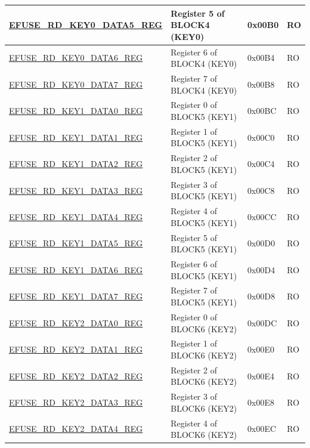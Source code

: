 \begin{longtable}{ | p{6.8cm} | p{7cm} | p{1.3cm} | p{1.2cm} | }
    \hyperref[regdesc:EFUSERDKEY0DATANREG]{EFUSE\_RD\_KEY0\_DATA5\_REG} & Register 5 of BLOCK4 (KEY0) & 0x00B0 & RO \\ \hline
    \hyperref[regdesc:EFUSERDKEY0DATANREG]{EFUSE\_RD\_KEY0\_DATA6\_REG} & Register 6 of BLOCK4 (KEY0) & 0x00B4 & RO \\ \hline
    \hyperref[regdesc:EFUSERDKEY0DATANREG]{EFUSE\_RD\_KEY0\_DATA7\_REG} & Register 7 of BLOCK4 (KEY0) & 0x00B8 & RO \\ \hline
    \hyperref[regdesc:EFUSERDKEY1DATANREG]{EFUSE\_RD\_KEY1\_DATA0\_REG} & Register 0 of BLOCK5 (KEY1) & 0x00BC & RO \\ \hline
    \hyperref[regdesc:EFUSERDKEY1DATANREG]{EFUSE\_RD\_KEY1\_DATA1\_REG} & Register 1 of BLOCK5 (KEY1) & 0x00C0 & RO \\ \hline
    \hyperref[regdesc:EFUSERDKEY1DATANREG]{EFUSE\_RD\_KEY1\_DATA2\_REG} & Register 2 of BLOCK5 (KEY1) & 0x00C4 & RO \\ \hline
    \hyperref[regdesc:EFUSERDKEY1DATANREG]{EFUSE\_RD\_KEY1\_DATA3\_REG} & Register 3 of BLOCK5 (KEY1) & 0x00C8 & RO \\ \hline
    \hyperref[regdesc:EFUSERDKEY1DATANREG]{EFUSE\_RD\_KEY1\_DATA4\_REG} & Register 4 of BLOCK5 (KEY1) & 0x00CC & RO \\ \hline
    \hyperref[regdesc:EFUSERDKEY1DATANREG]{EFUSE\_RD\_KEY1\_DATA5\_REG} & Register 5 of BLOCK5 (KEY1) & 0x00D0 & RO \\ \hline
    \hyperref[regdesc:EFUSERDKEY1DATANREG]{EFUSE\_RD\_KEY1\_DATA6\_REG} & Register 6 of BLOCK5 (KEY1) & 0x00D4 & RO \\ \hline
    \hyperref[regdesc:EFUSERDKEY1DATANREG]{EFUSE\_RD\_KEY1\_DATA7\_REG} & Register 7 of BLOCK5 (KEY1) & 0x00D8 & RO \\ \hline
    \hyperref[regdesc:EFUSERDKEY2DATANREG]{EFUSE\_RD\_KEY2\_DATA0\_REG} & Register 0 of BLOCK6 (KEY2) & 0x00DC & RO \\ \hline
    \hyperref[regdesc:EFUSERDKEY2DATANREG]{EFUSE\_RD\_KEY2\_DATA1\_REG} & Register 1 of BLOCK6 (KEY2) & 0x00E0 & RO \\ \hline
    \hyperref[regdesc:EFUSERDKEY2DATANREG]{EFUSE\_RD\_KEY2\_DATA2\_REG} & Register 2 of BLOCK6 (KEY2) & 0x00E4 & RO \\ \hline
    \hyperref[regdesc:EFUSERDKEY2DATANREG]{EFUSE\_RD\_KEY2\_DATA3\_REG} & Register 3 of BLOCK6 (KEY2) & 0x00E8 & RO \\ \hline
    \hyperref[regdesc:EFUSERDKEY2DATANREG]{EFUSE\_RD\_KEY2\_DATA4\_REG} & Register 4 of BLOCK6 (KEY2) & 0x00EC & RO \\ \hline

\end{longtable}
